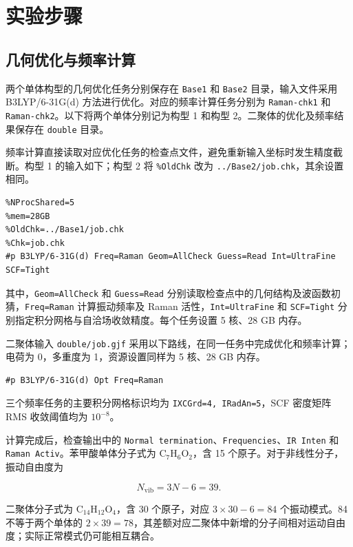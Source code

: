 \documentclass[a4paper,12pt]{article}
\begin{document}
\section{实验步骤}

\subsection{几何优化与频率计算}

两个单体构型的几何优化任务分别保存在 \nolinkurl{Base1} 和 \nolinkurl{Base2} 目录，输入文件采用 B3LYP/6-31G(d) 方法进行优化。对应的频率计算任务分别为 \nolinkurl{Raman-chk1} 和 \nolinkurl{Raman-chk2}。以下将两个单体分别记为构型 1 和构型 2。二聚体的优化及频率结果保存在 \nolinkurl{double} 目录。

频率计算直接读取对应优化任务的检查点文件，避免重新输入坐标时发生精度截断。构型 1 的输入如下；构型 2 将 \nolinkurl{%OldChk} 改为 \nolinkurl{../Base2/job.chk}，其余设置相同。

\begin{lstlisting}
%NProcShared=5
%mem=28GB
%OldChk=../Base1/job.chk
%Chk=job.chk
#p B3LYP/6-31G(d) Freq=Raman Geom=AllCheck Guess=Read Int=UltraFine SCF=Tight
\end{lstlisting}

其中，\nolinkurl{Geom=AllCheck} 和 \nolinkurl{Guess=Read} 分别读取检查点中的几何结构及波函数初猜，\nolinkurl{Freq=Raman} 计算振动频率及 Raman 活性，\nolinkurl{Int=UltraFine} 和 \nolinkurl{SCF=Tight} 分别指定积分网格与自洽场收敛精度。每个任务设置 5 核、28 GB 内存。

二聚体输入 \nolinkurl{double/job.gjf} 采用以下路线，在同一任务中完成优化和频率计算；电荷为 0，多重度为 1，资源设置同样为 5 核、28 GB 内存。

\begin{lstlisting}
#p B3LYP/6-31G(d) Opt Freq=Raman
\end{lstlisting}

三个频率任务的主要积分网格标识均为 \nolinkurl{IXCGrd=4, IRadAn=5}，SCF 密度矩阵 RMS 收敛阈值均为 $10^{-8}$。

计算完成后，检查输出中的 \nolinkurl{Normal termination}、\nolinkurl{Frequencies}、\nolinkurl{IR Inten} 和 \nolinkurl{Raman Activ}。苯甲酸单体分子式为 $\mathrm{C_7H_6O_2}$，含 15 个原子。对于非线性分子，振动自由度为

\[
N_{\mathrm{vib}}=3N-6=39.
\]

二聚体分子式为 $\mathrm{C_{14}H_{12}O_4}$，含 30 个原子，对应 $3\times30-6=84$ 个振动模式。84 不等于两个单体的 $2\times39=78$，其差额对应二聚体中新增的分子间相对运动自由度；实际正常模式仍可能相互耦合。
\end{document}
